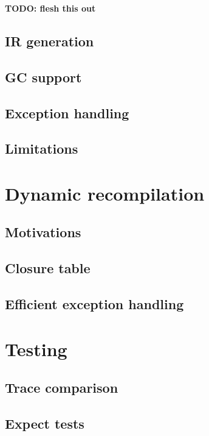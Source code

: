\textbf{TODO: flesh this out}

\subsection{IR generation} \label{opt-irgen}

\subsection{GC support}

\subsection{Exception handling}

\subsection{Limitations}

\section{Dynamic recompilation} \label{dyn-recomp}

\subsection{Motivations}

\subsection{Closure table}

\subsection{Efficient exception handling}

\section{Testing}

\subsection{Trace comparison}

\subsection{Expect tests}


